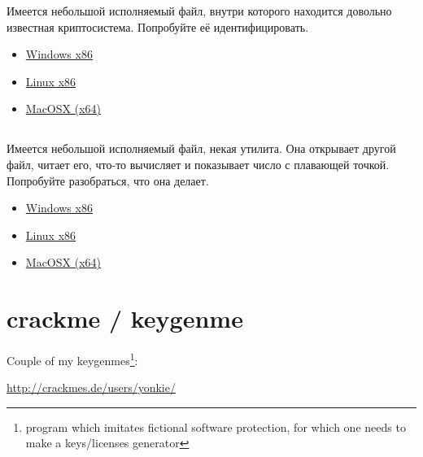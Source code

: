 Имеется небольшой исполняемый файл, внутри которого находится довольно известная криптосистема.
Попробуйте её идентифицировать.

\begin{itemize}
\item
\href{http://yurichev.com/RE-tasks/middle/2/unknown_cryptosystem.exe}{Windows x86}

\item
\href{http://yurichev.com/RE-tasks/middle/2/unknown_encryption_linux86.tar}{Linux x86}

\item
\href{http://yurichev.com/RE-tasks/middle/2/unknown_encryption_MacOSX.tar}{MacOSX (x64)}
\end{itemize}

\subsection{}

Имеется небольшой исполняемый файл, некая утилита.
Она открывает другой файл, читает его, что-то вычисляет и показывает число с плавающей точкой.
Попробуйте разобраться, что она делает.

\begin{itemize}
\item
\href{http://yurichev.com/RE-tasks/middle/3/unknown_utility_2_3.exe}{Windows x86}

\item
\href{http://yurichev.com/RE-tasks/middle/3/unknown_utility_2_3_Linux86.tar}{Linux x86}

\item
\href{http://yurichev.com/RE-tasks/middle/3/unknown_utility_2_3_MacOSX.tar}{MacOSX (x64)}
\end{itemize}

\section{crackme / keygenme}

{Couple of my keygenmes\footnote{program which imitates fictional software protection, 
for which one needs to make a keys/licenses generator}:}

\url{http://crackmes.de/users/yonkie/}

